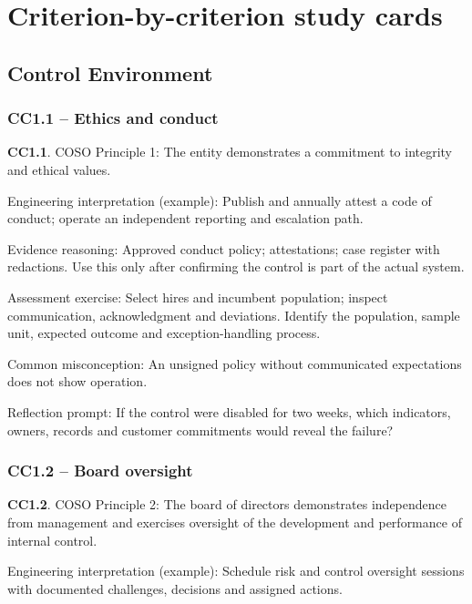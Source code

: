 \documentclass[10pt,oneside]{report}
\begin{document}
\chapter{Criterion-by-criterion study cards}
\section{Control Environment}
\subsection{CC1.1 -- Ethics and conduct}
\begin{aicpabox}
\textbf{CC1.1}. COSO Principle 1: The entity demonstrates a commitment to integrity and ethical values.\par{}
\end{aicpabox}
Engineering interpretation (example): Publish and annually attest a code of conduct; operate an independent reporting and escalation path.

Evidence reasoning: Approved conduct policy; attestations; case register with redactions. Use this only after confirming the control is part of the actual system.

Assessment exercise: Select hires and incumbent population; inspect communication, acknowledgment and deviations. Identify the population, sample unit, expected outcome and exception-handling process.

Common misconception: An unsigned policy without communicated expectations does not show operation.

Reflection prompt: If the control were disabled for two weeks, which indicators, owners, records and customer commitments would reveal the failure?

\subsection{CC1.2 -- Board oversight}
\begin{aicpabox}
\textbf{CC1.2}. COSO Principle 2: The board of directors demonstrates independence from management and exercises oversight of the development and performance of internal control.\par{}
\end{aicpabox}
Engineering interpretation (example): Schedule risk and control oversight sessions with documented challenges, decisions and assigned actions.
\end{document}
